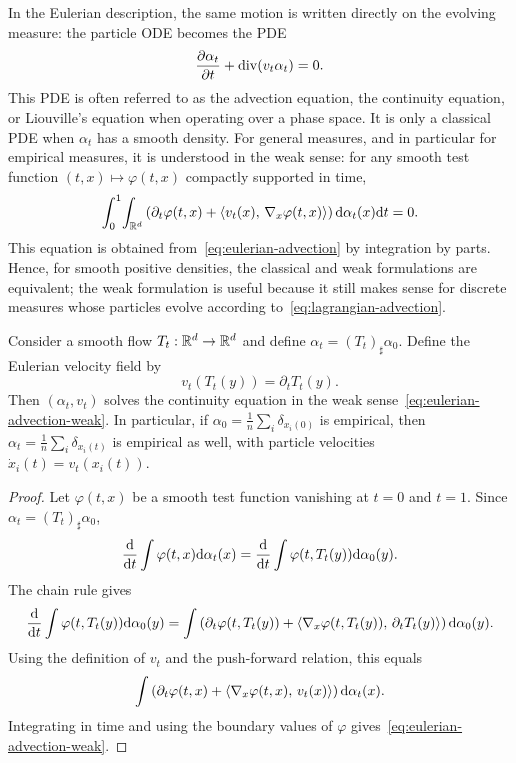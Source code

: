 In the Eulerian description, the same motion is written directly on the evolving measure: the particle ODE becomes the PDE
\begin{equation}
    \frac{\partial \alpha_t}{\partial t} + \operatorname{div}(v_t \alpha_t) = 0. \label{eq:eulerian-advection}
\end{equation}
This PDE is often referred to as the advection equation, the continuity equation, or Liouville's equation when operating over a phase space. It is only a classical PDE when $\alpha_t$ has a smooth density. For general measures, and in particular for empirical measures, it is understood in the weak sense: for any smooth test function $(t,x)\mapsto\varphi(t,x)$ compactly supported in time,
\begin{equation}\label{eq:eulerian-advection-weak}
	\int_0^1\!\int_{\mathbb{R}^d}
	\left(\partial_t\varphi(t,x)+\langle v_t(x),\,\nabla_x\varphi(t,x)\rangle\right)
	\mathrm{d}\alpha_t(x)\mathrm{d} t
	=
	0.
\end{equation}
This equation is obtained from~\eqref{eq:eulerian-advection} by integration by parts. Hence, for smooth positive densities, the classical and weak formulations are equivalent; the weak formulation is useful because it still makes sense for discrete measures whose particles evolve according to~\eqref{eq:lagrangian-advection}.

\begin{prop}\label{prop-lagrangian-flow-continuity}
	Consider a smooth flow $T_t:\mathbb{R}^d\to\mathbb{R}^d$ and define $\alpha_t=(T_t)_\sharp\alpha_0$. Define the Eulerian velocity field by
	\[
		v_t(T_t(y))=\partial_t T_t(y).
	\]
	Then $(\alpha_t,v_t)$ solves the continuity equation in the weak sense~\eqref{eq:eulerian-advection-weak}.
	In particular, if $\alpha_0=\frac1n\sum_i\delta_{x_i(0)}$ is empirical, then $\alpha_t=\frac1n\sum_i\delta_{x_i(t)}$ is empirical as well, with particle velocities $\dot x_i(t)=v_t(x_i(t))$.
\end{prop}

\begin{proof}
	Let $\varphi(t,x)$ be a smooth test function vanishing at $t=0$ and $t=1$. Since $\alpha_t=(T_t)_\sharp\alpha_0$,
	\[
		\frac{\mathrm{d}}{\mathrm{d} t}\int \varphi(t,x)\mathrm{d}\alpha_t(x)
		=
		\frac{\mathrm{d}}{\mathrm{d} t}\int \varphi(t,T_t(y))\mathrm{d}\alpha_0(y).
	\]
	The chain rule gives
	\[
		\frac{\mathrm{d}}{\mathrm{d} t}\int \varphi(t,T_t(y))\mathrm{d}\alpha_0(y)
		=
		\int
		\left(
			\partial_t\varphi(t,T_t(y))
			+\langle \nabla_x\varphi(t,T_t(y)),\,\partial_t T_t(y)\rangle
		\right)
		\mathrm{d}\alpha_0(y).
	\]
	Using the definition of $v_t$ and the push-forward relation, this equals
	\[
		\int
		\left(
			\partial_t\varphi(t,x)+\langle \nabla_x\varphi(t,x),\,v_t(x)\rangle
		\right)
		\mathrm{d}\alpha_t(x).
	\]
	Integrating in time and using the boundary values of $\varphi$ gives~\eqref{eq:eulerian-advection-weak}.
\end{proof}

